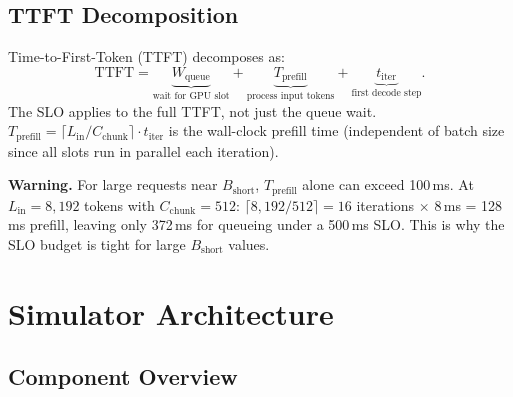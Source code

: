 \documentclass[11pt,a4paper]{article}
\newenvironment{warning}
  {\begin{mdframed}[backgroundcolor=orange!8!white,linecolor=orange!70!black,linewidth=1pt]
   \textbf{Warning. }\ignorespaces}
  {\end{mdframed}}
\newcommand{\Bshort}{B_{\text{short}}}
\begin{document}
\subsection{TTFT Decomposition}
\label{sec:ttft}

Time-to-First-Token (TTFT) decomposes as:
\begin{equation}
  \text{TTFT} = \underbrace{W_{\text{queue}}}_{\text{wait for GPU slot}}
    + \underbrace{T_{\text{prefill}}}_{\text{process input tokens}}
    + \underbrace{t_{\text{iter}}}_{\text{first decode step}}.
\end{equation}
The SLO applies to the full TTFT, not just the queue wait.
$T_{\text{prefill}} = \lceil L_{\text{in}}/C_{\text{chunk}}\rceil
\cdot t_{\text{iter}}$ is the wall-clock prefill time (independent of
batch size since all slots run in parallel each iteration).

\begin{warning}
  For large requests near $\Bshort$, $T_{\text{prefill}}$ alone can
  exceed 100\,ms.  At $L_{\text{in}} = 8{,}192$ tokens with
  $C_{\text{chunk}} = 512$: $\lceil 8{,}192/512 \rceil = 16$
  iterations $\times$ 8\,ms = 128\,ms prefill, leaving only 372\,ms
  for queueing under a 500\,ms SLO.  This is why the SLO budget is
  tight for large $\Bshort$ values.
\end{warning}

\section{Simulator Architecture}
\label{sec:architecture}

\subsection{Component Overview}
\end{document}
